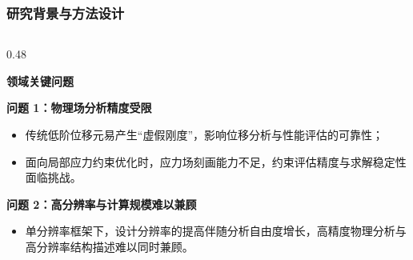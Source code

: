 \documentclass[notheorems]{beamer}
\begin{document}
	\begin{frame}
		\frametitle{研究背景与方法设计}
		
		\vspace{-2em}   %
		
		\begin{columns}[t, totalwidth=\linewidth]	
			\begin{column}{0.48\linewidth}
				\begin{tcolorbox}[
					colback=structure.fg, colframe=structure.fg,
					coltext=white, boxrule=0pt, arc=2pt,
					top=3pt, bottom=3pt, left=6pt, right=6pt,
					]
					\centering\bfseries 领域关键问题
				\end{tcolorbox}
				
				\vspace{0.4em}
				
				\begin{tcolorbox}[
					colback=panelbg, colframe=structure.fg!50,
					boxrule=0.5pt, arc=2pt,
					top=6pt, bottom=6pt, left=6pt, right=6pt,
					]
					{\fontsize{7.5}{11}\selectfont\sffamily
						\textbf{问题 1：物理场分析精度受限}
						\setlength{\itemsep}{2pt}
						\setlength{\parsep}{0pt}
						\setlength{\topsep}{4pt}
						\begin{itemize}
							\item 传统低阶位移元易产生“虚假刚度”，影响位移分析与性能评估的可靠性；
							\item 面向局部应力约束优化时，应力场刻画能力不足，约束评估精度与求解稳定性面临挑战。
						\end{itemize}
						
						\vspace{8pt}
						\textbf{问题 2：高分辨率与计算规模难以兼顾}
						\setlength{\itemsep}{2pt}
						\setlength{\parsep}{0pt}
						\setlength{\topsep}{4pt}
						\begin{itemize}
							\item 单分辨率框架下，设计分辨率的提高伴随分析自由度增长，高精度物理分析与高分辨率结构描述难以同时兼顾。
						\end{itemize}
					}
				\end{tcolorbox}
			\end{column}
			
			\hfill
			

\end{columns}
\end{frame}
\end{document}
